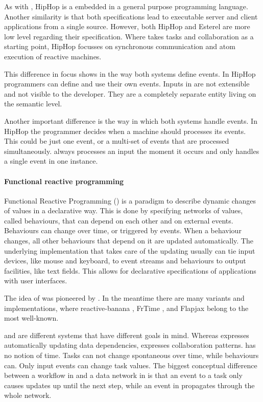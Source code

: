 As with \TOPHAT, HipHop is a \DSL embedded in a general purpose programming language.
Another similarity is that both specifications lead to executable server and client applications from a single source.
However, both HipHop and Esterel are more low level regarding their specification.
Where \TOPHAT takes tasks and collaboration as a starting point,
HipHop focusses on synchronous communication and atom execution of reactive machines.

This difference in focus shows in the way both systems define events.
In HipHop programmers can define and use their own events.
Inputs in \TOPHAT are not extensible and not visible to the developer.
They are a completely separate entity living on the semantic level.

Another important difference is the way in which both systems handle events.
In HipHop the programmer decides when a machine should processes its events.
This could be just one event, or a multi-set of events that are processed simultaneously.
\TOPHAT always processes an input the moment it occurs and only handles a single event in one instance.



\paragraph{Functional reactive programming}

Functional Reactive Programming (\FRP) is a paradigm to describe dynamic changes of values in a declarative way.
This is done by specifying networks of values, called behaviours, that can depend on each other and on external events.
Behaviours can change over time, or triggered by events.
When a behaviour changes, all other behaviours that depend on it are updated automatically.
The underlying implementation that takes care of the updating usually can tie input devices, like mouse and keyboard, to event streams and behaviours to output facilities, like text fields.
This allows for declarative specifications of applications with user interfaces.

The idea of \FRP was pioneered by \citet{conf/icfp/ElliottH97}.
In the meantime there are many variants and implementations, where reactive-banana \cite{reactive-banana}, FrTime \cite{CooperK04}, and Flapjax \cite{conf/oopsla/MeyerovichGBCGBK09} belong to the most well-known.

\FRP and \TOP are different systems that have different goals in mind.
Whereas \FRP expresses automatically updating data dependencies, \TOP expresses collaboration patterns.
\TOP has no notion of time.
Tasks can not change spontaneous over time, while behaviours can.
Only input events can change task values.
The biggest conceptual difference between a workflow in \TOP and a data network in \FRP is that an event to a task only causes updates up until the next step, while an event in \FRP propagates through the whole network.

